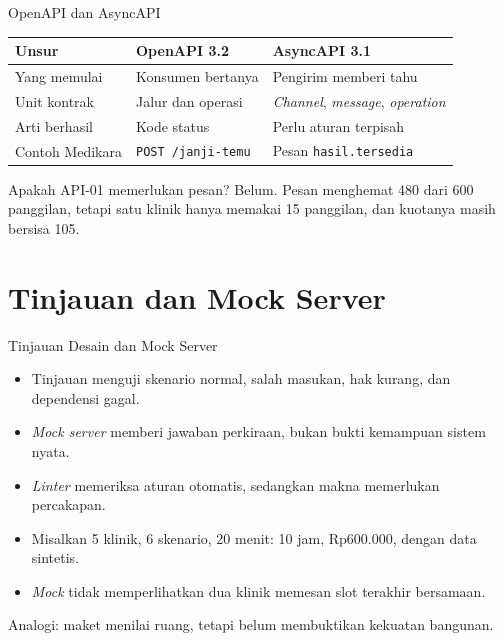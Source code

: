 \documentclass[aspectratio=169, table, 12pt]{beamer}
\begin{document}
\begin{frame}{{\Large OpenAPI dan AsyncAPI}}
  \footnotesize
  \begin{tabularx}{\textwidth}{>{\raggedright\arraybackslash}p{2.8cm} >{\raggedright\arraybackslash}X >{\raggedright\arraybackslash}X}
    \hline
    \textbf{Unsur} & \textbf{OpenAPI 3.2} & \textbf{AsyncAPI 3.1} \\ \hline
    Yang memulai & Konsumen bertanya & Pengirim memberi tahu \\ \hline
    Unit kontrak & Jalur dan operasi & \textit{Channel}, \textit{message}, \textit{operation} \\ \hline
    Arti berhasil & Kode status & Perlu aturan terpisah \\ \hline
    Contoh Medikara & \texttt{POST /janji-temu} & Pesan \texttt{hasil.tersedia} \\ \hline
  \end{tabularx}

  \vspace{8pt}
  \small Apakah API-01 memerlukan pesan? Belum. Pesan menghemat 480 dari 600 panggilan, tetapi satu klinik hanya memakai 15 panggilan, dan kuotanya masih bersisa 105.
\end{frame}

\section{Tinjauan dan Mock Server}

\begin{frame}{{\Large Tinjauan Desain dan Mock Server}}
  \vspace{8pt}
  \begin{itemize}
    \item Tinjauan menguji skenario normal, salah masukan, hak kurang, dan dependensi gagal.
    \item \textit{Mock server} memberi jawaban perkiraan, bukan bukti kemampuan sistem nyata.
    \item \textit{Linter} memeriksa aturan otomatis, sedangkan makna memerlukan percakapan.
    \item Misalkan 5 klinik, 6 skenario, 20 menit: 10 jam, Rp600.000, dengan data sintetis.
    \item \textit{Mock} tidak memperlihatkan dua klinik memesan slot terakhir bersamaan.
  \end{itemize}
  \vspace{6pt}
  {\small Analogi: maket menilai ruang, tetapi belum membuktikan kekuatan bangunan.}
\end{frame}
\end{document}

